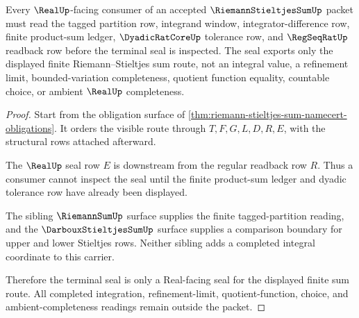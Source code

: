 \begin{theorem}
\label{thm:riemann-stieltjes-sum-real-seal-nonescape}
Every $\RealUp$-facing consumer of an accepted $\RiemannStieltjesSumUp$ packet must read the tagged partition row, integrand window, integrator-difference row, finite product-sum ledger, $\DyadicRatCoreUp$ tolerance row, and $\RegSeqRatUp$ readback row before the terminal seal is inspected. The seal exports only the displayed finite Riemann--Stieltjes sum route, not an integral value, a refinement limit, bounded-variation completeness, quotient function equality, countable choice, or ambient $\RealUp$ completeness.
\end{theorem}
\begin{proof}
Start from the obligation surface of \autoref{thm:riemann-stieltjes-sum-namecert-obligations}. It orders the visible route through $T,F,G,L,D,R,E$, with the structural rows attached afterward.

The $\RealUp$ seal row $E$ is downstream from the regular readback row $R$. Thus a consumer cannot inspect the seal until the finite product-sum ledger and dyadic tolerance row have already been displayed.

The sibling $\RiemannSumUp$ surface supplies the finite tagged-partition reading, and the $\DarbouxStieltjesSumUp$ surface supplies a comparison boundary for upper and lower Stieltjes rows. Neither sibling adds a completed integral coordinate to this carrier.

Therefore the terminal seal is only a Real-facing seal for the displayed finite sum route. All completed integration, refinement-limit, quotient-function, choice, and ambient-completeness readings remain outside the packet.
\end{proof}



